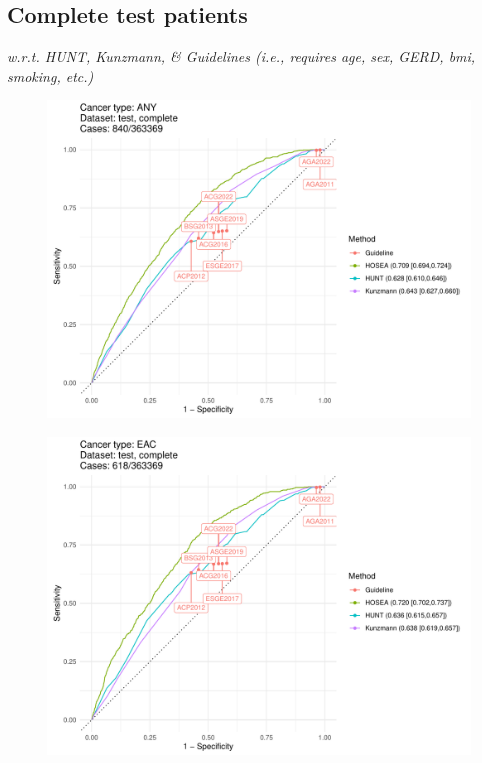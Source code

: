 \documentclass[english]{article}
\begin{document}
\newpage
\clearpage
\subsection{Complete test patients}
\textit{w.r.t. HUNT, Kunzmann, \& Guidelines (i.e., requires age, sex, GERD, bmi, smoking, etc.)}

\begin{figure}[ht]
\includegraphics[width=1.0\linewidth]{comparison/ANY_complete.pdf}
\end{figure}
\begin{figure}[ht]
\includegraphics[width=1.0\linewidth]{comparison/EAC_complete.pdf}
\end{figure}
\end{document}
